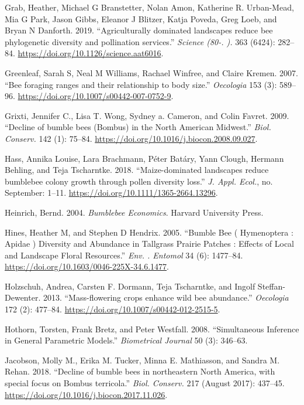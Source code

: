 \documentclass[11pt,]{article}
\begin{document}
\leavevmode\hypertarget{ref-Grab2019}{}%
Grab, Heather, Michael G Branstetter, Nolan Amon, Katherine R.
Urban-Mead, Mia G Park, Jason Gibbs, Eleanor J Blitzer, Katja Poveda,
Greg Loeb, and Bryan N Danforth. 2019. ``Agriculturally dominated
landscapes reduce bee phylogenetic diversity and pollination services.''
\emph{Science (80-. ).} 363 (6424): 282--84.
\url{https://doi.org/10.1126/science.aat6016}.

\leavevmode\hypertarget{ref-Greenleaf2007b}{}%
Greenleaf, Sarah S, Neal M Williams, Rachael Winfree, and Claire Kremen.
2007. ``Bee foraging ranges and their relationship to body size.''
\emph{Oecologia} 153 (3): 589--96.
\url{https://doi.org/10.1007/s00442-007-0752-9}.

\leavevmode\hypertarget{ref-Grixti2009}{}%
Grixti, Jennifer C., Lisa T. Wong, Sydney a. Cameron, and Colin Favret.
2009. ``Decline of bumble bees (Bombus) in the North American Midwest.''
\emph{Biol. Conserv.} 142 (1): 75--84.
\url{https://doi.org/10.1016/j.biocon.2008.09.027}.

\leavevmode\hypertarget{ref-Hass2018a}{}%
Hass, Annika Louise, Lara Brachmann, Péter Batáry, Yann Clough, Hermann
Behling, and Teja Tscharntke. 2018. ``Maize-dominated landscapes reduce
bumblebee colony growth through pollen diversity loss.'' \emph{J. Appl.
Ecol.}, no. September: 1--11.
\url{https://doi.org/10.1111/1365-2664.13296}.

\leavevmode\hypertarget{ref-Heinrich2004}{}%
Heinrich, Bernd. 2004. \emph{Bumblebee Economics}. Harvard University
Press.

\leavevmode\hypertarget{ref-Hines2005}{}%
Hines, Heather M, and Stephen D Hendrix. 2005. ``Bumble Bee (
Hymenoptera : Apidae ) Diversity and Abundance in Tallgrass Prairie
Patches : Effects of Local and Landscape Floral Resources.'' \emph{Env.
. Entomol} 34 (6): 1477--84.
\url{https://doi.org/10.1603/0046-225X-34.6.1477}.

\leavevmode\hypertarget{ref-Holzschuh2013}{}%
Holzschuh, Andrea, Carsten F. Dormann, Teja Tscharntke, and Ingolf
Steffan-Dewenter. 2013. ``Mass-flowering crops enhance wild bee
abundance.'' \emph{Oecologia} 172 (2): 477--84.
\url{https://doi.org/10.1007/s00442-012-2515-5}.

\leavevmode\hypertarget{ref-multcomp}{}%
Hothorn, Torsten, Frank Bretz, and Peter Westfall. 2008. ``Simultaneous
Inference in General Parametric Models.'' \emph{Biometrical Journal} 50
(3): 346--63.

\leavevmode\hypertarget{ref-Jacobson2018a}{}%
Jacobson, Molly M., Erika M. Tucker, Minna E. Mathiasson, and Sandra M.
Rehan. 2018. ``Decline of bumble bees in northeastern North America,
with special focus on Bombus terricola.'' \emph{Biol. Conserv.} 217
(August 2017): 437--45.
\url{https://doi.org/10.1016/j.biocon.2017.11.026}.
\end{document}
